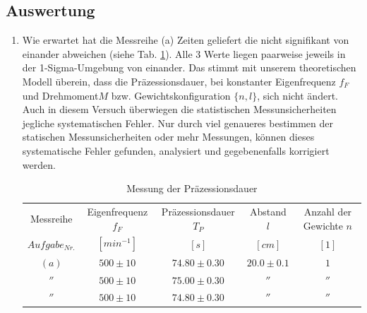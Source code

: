 \documentclass[a4paper,10pt]{article}
\begin{document}
\subsection{Auswertung}
\begin{enumerate}[label=(\alph*)]
\item Wie erwartet hat die Messreihe (a) Zeiten geliefert die nicht signifikant von einander abweichen (siehe Tab. \ref{tab:Tab2a}). Alle 3 Werte liegen paarweise jeweils in der 1-Sigma-Umgebung von einander. Das stimmt mit unserem theoretischen Modell überein, dass die Präzessionsdauer, bei konstanter Eigenfrequenz \(f_F\) und Drehmoment\(M\) bzw. Gewichtskonfiguration \(\{ n, l\}\), sich nicht ändert. Auch in diesem Versuch überwiegen die statistischen Messunsicherheiten jegliche systematischen Fehler. Nur durch viel genaueres bestimmen der statischen Messunsicherheiten oder mehr Messungen, können dieses systematische Fehler gefunden, analysiert und gegebenenfalls korrigiert werden.
\unboldmath
\begin{table}[htb]
\centering
\caption{Messung der  Präzessionsdauer}\label{tab:Tab2a}
\begin{threeparttable}
\begin{tabular}{ccccc}
\toprule
Messreihe & Eigenfrequenz \boldmath\(f_F\)\unboldmath & Präzessionsdauer \boldmath\(T_P\)\unboldmath  &Abstand \boldmath\(l\)\unboldmath & Anzahl der Gewichte  \boldmath\(n\)\unboldmath \\
\(Aufgabe_{Nr.}\)&\([min^{-1}]\)&\([s]\)&\([cm]\)&\([1]\)\\
\midrule
\((a)\)&\(500\pm10\)&\(74.80\pm0.30\)&\(20.0\pm0.1\)&\(1\)\\
\(''\)&\(500\pm10\)&\(75.00\pm0.30\)&\(''\)&\(''\)\\
\(''\)&\(500\pm10\)&\(74.80\pm0.30\)&\(''\)&\(''\)\\
\bottomrule
 \end{tabular}
\end{threeparttable}\end{table}

\end{enumerate}
\end{document}
